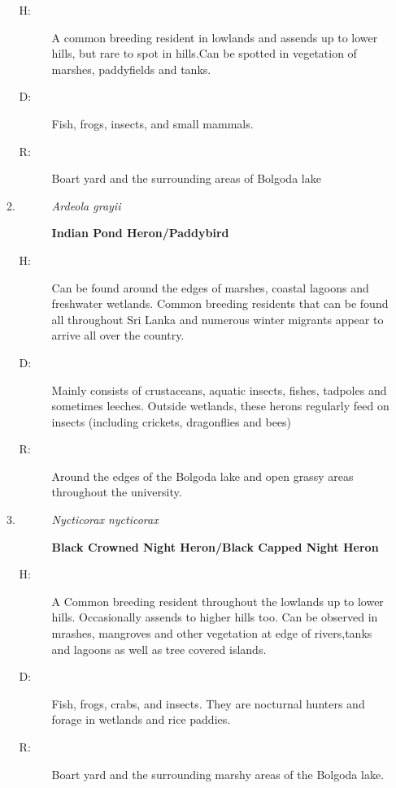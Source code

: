 \begin{itemize}
\begin{enumerate}
\begin{description}
\item[H: ]%
A common breeding resident in lowlands and assends up to lower hills, but rare to spot in hills.Can be spotted in vegetation of marshes, paddyfields and tanks. %
\item[D: ]%
Fish, frogs, insects, and small mammals.%
\item[R: ]%
Boart yard and the surrounding areas of Bolgoda lake%
\end{description}%
\item%
\begin{description}%
\item[]%
\textit{Ardeola grayii}%
\item[]%
\textbf{Indian Pond Heron/Paddybird}%
\end{description}%
\begin{description}%
\item[H: ]%
Can be found around the edges of marshes, coastal lagoons and freshwater wetlands. Common breeding residents that can be found all throughout Sri Lanka and numerous winter migrants appear to arrive all over the country. %
\item[D: ]%
Mainly consists of crustaceans, aquatic insects, fishes, tadpoles and sometimes leeches. Outside wetlands, these herons regularly feed on insects (including crickets, dragonflies and bees)%
\item[R: ]%
Around the edges of the Bolgoda lake and open grassy areas throughout the university.%
\end{description}%
\item%
\begin{description}%
\item[]%
\textit{Nycticorax nycticorax}%
\item[]%
\textbf{Black Crowned Night Heron/Black Capped Night Heron}%
\end{description}%
\begin{description}%
\item[H: ]%
A Common breeding resident throughout the lowlands  up to lower hills. Occasionally assends to higher hills too. Can be observed in mrashes, mangroves and other vegetation at edge of rivers,tanks and lagoons as well as tree covered islands.%
\item[D: ]%
Fish, frogs, crabs, and insects. They are nocturnal hunters and forage in wetlands and rice paddies.%
\item[R: ]%
Boart yard and the surrounding marshy areas of the Bolgoda lake. %
\end{description}%

\end{enumerate}
\end{itemize}
